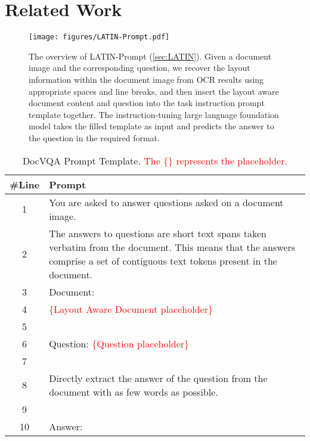 \documentclass[letterpaper]{article} \usepackage{aaai24_preprint}  \usepackage{times}  \usepackage{helvet}  \usepackage{courier}  \usepackage[hyphens]{url}  \usepackage{graphicx} \urlstyle{rm} \def\UrlFont{\rm}  \usepackage{natbib}  \usepackage{caption} \frenchspacing  \setlength{\pdfpagewidth}{8.5in} \setlength{\pdfpageheight}{11in} \usepackage{algorithm}
\begin{document}
\section{Related Work}
\begin{figure*}[t]
\small
\centering
\texttt{[image: figures/LATIN-Prompt.pdf]}
\caption{
The overview of LATIN-Prompt (\cref{sec:LATIN}).
Given a document image and the corresponding question, we recover the layout information within the document image from OCR results using appropriate spaces and line breaks, and then insert the layout aware document content and question into the task instruction prompt template together.
The instruction-tuning large language foundation model takes the filled template as input and predicts the answer to the question in the required format.
}
\label{fig:LATIN}
\end{figure*}

\begin{table*}[t]
    \small
    \centering
    \begin{tabular}{cl}
    \toprule
    \#Line& Prompt\\
    \midrule
    1& You are asked to answer questions asked on a document image.\\
    2& \parbox[c]{16cm}{
    The answers to questions are short text spans taken verbatim from the document.
    This means that the answers comprise a set of contiguous text tokens present in the document.}\\
    3& Document:\\
    4& \textcolor{red}{\{Layout Aware Document placeholder\}}\\
    5& \\
    6& Question: \textcolor{red}{\{Question placeholder\}}\\
    7&\\
    8&Directly extract the answer of the question from the document with as few words as possible.\\
    9&\\
    10&Answer:\\
    \bottomrule
\end{tabular}
\caption{DocVQA Prompt Template. \textcolor{red}{The \{\} represents the placeholder.}}
\label{tab:docvqa_prompt}
\end{table*}
\end{document}
